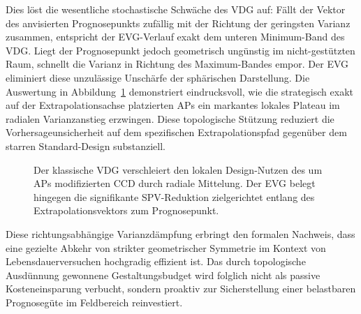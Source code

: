 Dies löst die wesentliche stochastische Schwäche des \ac{VDG} auf: Fällt der Vektor des anvisierten Prognosepunkts zufällig mit der Richtung der geringsten Varianz zusammen, entspricht der \ac{EVG}-Verlauf exakt dem unteren Minimum-Band des \ac{VDG}. Liegt der Prognosepunkt jedoch geometrisch ungünstig im nicht-gestützten Raum, schnellt die Varianz in Richtung des Maximum-Bandes empor.
Der \ac{EVG} eliminiert diese unzulässige Unschärfe der sphärischen Darstellung. Die Auswertung in Abbildung~\ref{fig:ma_abb5.2.2_evg} demonstriert eindrucksvoll, wie die strategisch exakt auf der Extrapolationsachse platzierten \acp{AP} ein markantes lokales Plateau im radialen Varianzanstieg erzwingen.
Diese topologische Stützung reduziert die Vorhersageunsicherheit auf dem spezifischen Extrapolationspfad gegenüber dem starren Standard-Design substanziell.
\begin{figure}[htbp]
    \centering
    \setlength{}
    \setlength\figureheight{6cm}
    
    \caption{Der klassische \ac{VDG} verschleiert den lokalen Design-Nutzen des um \acp{AP} modifizierten \ac{CCD} durch radiale Mittelung. Der \ac{EVG} belegt hingegen die signifikante \ac{SPV}-Reduktion zielgerichtet entlang des Extrapolationsvektors zum Prognosepunkt.}
    \label{fig:ma_abb5.2.2_evg}
\end{figure}

Diese richtungsabhängige Varianzdämpfung erbringt den formalen Nachweis, dass eine gezielte Abkehr von strikter geometrischer Symmetrie im Kontext von Lebensdauerversuchen hochgradig effizient ist.
Das durch topologische Ausdünnung gewonnene Gestaltungsbudget wird folglich nicht als passive Kosteneinsparung verbucht, sondern proaktiv zur Sicherstellung einer belastbaren Prognosegüte im Feldbereich reinvestiert.



